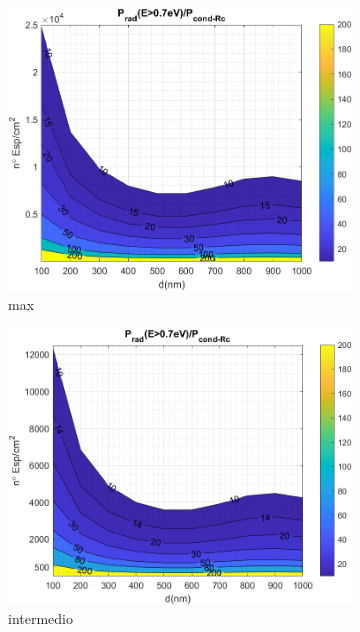\begin{figure}[H]
\begin{subfigure}[b]{0.49\textwidth}
		\label{fig:rel_SsSiO2Ge_Rc_emp}
	\end{subfigure}
	\hfill
	\begin{subfigure}[b]{0.49\textwidth}
		\centering
			\includegraphics[width=1.00\textwidth]{figuras/Resultados/RelacionCondRad/SS_Rc.png}
		\caption{ max}
		\label{fig:rel_SsSiO2Ge_Rc_max}
	\end{subfigure}
	\hfill
	\begin{subfigure}[b]{0.49\textwidth}
		\centering
			\includegraphics[width=1.00\textwidth]{figuras/Resultados/RelacionCondRad/SS_Rc_Intermedio.png}
		\caption{ intermedio}
		\label{fig:rel_SsSiO2Ge_Rc_inter}
	\end{subfigure}
	\caption{ }
	\label{fig:relation_SsSiO2Ge}
\end{figure}

